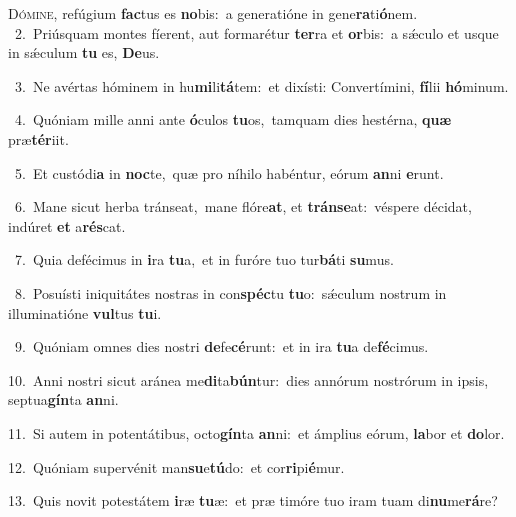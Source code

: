 \lettrine{\initial\textcolor{\initialcolor}{D}}{ómine,} refúgium \textbf{fac}\-tus es \textbf{no}\-bis:~\star a generatióne in gene\-\textbf{ra}\-ti\-\textbf{ó}\-nem.\\
{\numbfont\textcolor{\numbcolor}{~2.}}~Priúsquam montes fíerent, aut formarétur \textbf{ter}\-ra et \textbf{or}\-bis:~\star a sǽculo et usque in sǽculum \textbf{tu} es, \textbf{De}\-us.\par
{\numbfont\textcolor{\numbcolor}{~3.}}~Ne avértas hóminem in hu\-\textbf{mi}\-li\-\textbf{tá}\-tem:~\star et dixísti: Convertímini, \textbf{fí}\-lii \textbf{hó}\-minum.\par
{\numbfont\textcolor{\numbcolor}{~4.}}~Quóniam mille anni ante \textbf{ó}\-culos \textbf{tu}\-os,~\star tamquam dies hestérna, \textbf{quæ} præ\-\textbf{tér}\-iit.\par
{\numbfont\textcolor{\numbcolor}{~5.}}~Et custódi\textbf{a} in \textbf{noc}\-te,~\star quæ pro níhilo habéntur, eórum \textbf{an}\-ni \textbf{e}\-runt.\par
{\numbfont\textcolor{\numbcolor}{~6.}}~Mane sicut herba tránseat,~\dagger mane flóre\-\textbf{at}\-, et \textbf{tráns}\-\textbf{e}at:~\star véspere décidat, indúret \textbf{et} a\-\textbf{rés}\-cat.\par
{\numbfont\textcolor{\numbcolor}{~7.}}~Quia defécimus in \textbf{i}\-ra \textbf{tu}\-a,~\star et in furóre tuo tur\-\textbf{bá}\-ti \textbf{su}\-mus.\par
{\numbfont\textcolor{\numbcolor}{~8.}}~Posuísti iniquitátes nostras in con\-\textbf{spéc}\-tu \textbf{tu}\-o:~\star sǽculum nostrum in illuminatióne \textbf{vul}\-tus \textbf{tu}\-i.\par
{\numbfont\textcolor{\numbcolor}{~9.}}~Quóniam omnes dies nostri \textbf{de}\-fe\-\textbf{cé}\-runt:~\star et in ira \textbf{tu}\-a de\-\textbf{fé}\-cimus.\par
{\numbfont\textcolor{\numbcolor}{10.}}~Anni nostri sicut aránea me\-\textbf{di}\-ta\-\textbf{bún}\-tur:~\star dies annórum nostrórum in ipsis, septua\-\textbf{gín}\-ta \textbf{an}\-ni.\par
{\numbfont\textcolor{\numbcolor}{11.}}~Si autem in potentátibus, octo\-\textbf{gín}\-ta \textbf{an}\-ni:~\star et ámplius eórum, \textbf{la}\-bor et \textbf{do}\-lor.\par
{\numbfont\textcolor{\numbcolor}{12.}}~Quóniam supervénit man\-\textbf{su}\-e\-\textbf{tú}\-do:~\star et cor\-\textbf{ri}\-pi\-\textbf{é}\-mur.\par
{\numbfont\textcolor{\numbcolor}{13.}}~Quis novit potestátem \textbf{i}\-ræ \textbf{tu}\-æ:~\star et præ timóre tuo iram tuam di\-\textbf{nu}\-me\-\textbf{rá}\-re?\par
